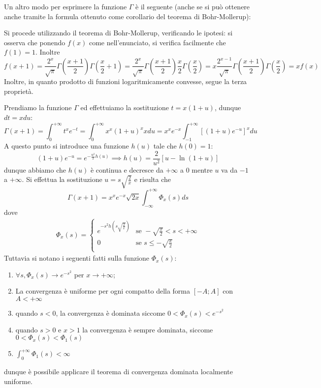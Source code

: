 \documentclass{report}
\begin{document}
\noindent Un altro modo per esprimere la funzione $\Gamma$ è il seguente (anche se si può ottenere anche tramite la formula ottenuto come corollario del teorema di Bohr-Mollerup):
\pagebreak
{}
\begin{myproof}
Si procede utilizzando il teorema di Bohr-Mollerup, verificando le ipotesi: si osserva che ponendo $f(x)$ come nell'enunciato, si verifica facilmente che $f(1) = 1$. Inoltre
$$
f(x+1) = \frac{2^x}{\sqrt{\pi}}\Gamma \left( \frac{x+1}{2} \right)\Gamma \left( \frac{x}{2} + 1 \right) = \frac{2^x}{\sqrt{\pi}} \Gamma \left( \frac{x+1}{2} \right) \frac{x}{2} \Gamma \left( \frac{x}{2} \right) = x \frac{2^{x-1}}{\sqrt{\pi}} \Gamma \left( \frac{x+1}{2} \right) \Gamma \left( \frac{x}{2} \right) = x f(x)
$$
Inoltre, in quanto prodotto di funzioni logaritmicamente convesse, segue la terza proprietà.
\end{myproof}
\begin{myproof}
Prendiamo la funzione $\Gamma$ ed effettuiamo la sostituzione $t=x(1+u)$, dunque $dt = xdu$:
$$
\Gamma(x+1) = \int_{0}^{+\infty} t^{x} e^{-t} = \int_{0}^{+\infty} x^x (1+u)^x xdu = x^x e^{-x} \int_{-1}^{+\infty}  [(1+u)e^{-u}]^x du
$$
A questo punto si introduce una funzione $h(u)$ tale che $h(0)=1$:
$$
(1+u)e^{-u} = e^{-\frac{u^2}{2} h(u)} \implies h(u) = \frac{2}{u^2} [u - \ln{(1+u)}]
$$
dunque abbiamo che $h(u)$ è continua e decresce da $+\infty$ a $0$ mentre $u$ va da $-1$ a $+\infty$. Si effettua la sostituzione $u=s\sqrt{\frac{2}{x}}$ e risulta che
$$
\Gamma(x+1) = x^x e^{-x} \sqrt{2x} \int_{-\infty}^{+\infty} \Phi_x(s)ds
$$
dove
\begin{align*}
\Phi_x(s) = \begin{cases}
    e^{-s^2 h\left(s \sqrt{\frac{2}{x}}\right)} & \text{se } -\sqrt{\frac{x}{2}} < s < +\infty \\
    0 & \text{se } s \leq - \sqrt{\frac{x}{2}} \\
\end{cases}
\end{align*}
Tuttavia si notano i seguenti fatti sulla funzione $\Phi_x(s)$:
\begin{enumerate}[label=\protect\circled{\arabic*}]
	\item $\forall s, \Phi_x(s) \to e^{-s^2}$ per $x \to +\infty$;
	\item La convergenza è uniforme per ogni compatto della forma $[-A; A]$ con $A < +\infty$
	\item quando $s<0$, la convergenza è dominata siccome $0 < \Phi_x(s) < e^{-s^2}$
	\item quando $s>0$ e $x>1$ la convergenza è sempre dominata, siccome $0 < \Phi_x(s) < \Phi_1(s)$
	\item $\int_{0}^{+\infty} \Phi_1(s) < \infty$
\end{enumerate}
dunque è possibile applicare il teorema di convergenza dominata localmente uniforme.
\end{myproof}
\end{document}
